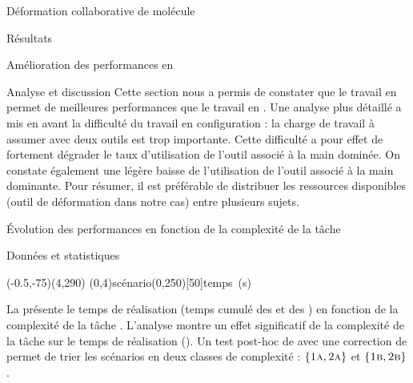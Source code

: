 \documentclass[myfrancais,ngerman,english,frenchb]{mythesis}
\begin{document}
\begin{mychapter}{Déformation collaborative de molécule}
\begin{mysection}{Résultats}
\begin{mysubsection}{Amélioration des performances en }
\begin{mysubsubsection}{Analyse et discussion}
					Cette section nous a permis de constater que le travail en  permet de meilleures performances que le travail en .
					Une analyse plus détaillé a mis en avant la difficulté du travail en configuration  : la charge de travail à assumer avec deux outils est trop importante.
					Cette difficulté a pour effet de fortement dégrader le taux d'utilisation de l'outil associé à la main dominée.
					On constate également une légère baisse de l'utilisation de l'outil associé à la main dominante.
					Pour résumer, il est préférable de distribuer les ressources disponibles (outil de déformation dans notre cas) entre plusieurs sujets.
				\end{mysubsubsection}
			\end{mysubsection}
			\begin{mysubsection}{Évolution des performances en fonction de la complexité de la tâche}
				\begin{mysubsubsection}{Données et statistiques}
					\begin{myfigure}
						\begin{myps}(-0.5,-75)(4,290)
							\myaxes(0,4){scénario}(0,250)[50]{temps~(s)}
						\end{myps}
					\end{myfigure}

					La  présente le temps de réalisation  (temps cumulé des  et des ) en fonction de la complexité de la tâche .
					L'analyse montre un effet significatif de la complexité de la tâche  sur le temps de réalisation  ().
					Un test post-hoc de  avec une correction de  permet de trier les scénarios en deux classes de complexité : $\left\{\textsc{1a}, \textsc{2a}\right\}$ et $\left\{\textsc{1b}, \textsc{2b}\right\}$.


\end{mysubsubsection}
\end{mysubsection}
\end{mysection}
\end{mychapter}
\end{document}
